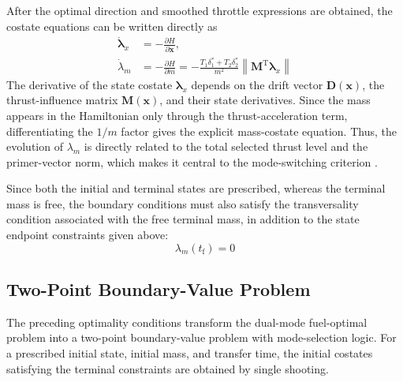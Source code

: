 ﻿\documentclass{IEEEtaes}
\begin{document}
After the optimal direction and smoothed throttle expressions are obtained, the costate equations can be written directly as
\begin{equation}
\begin{aligned}
\dot{\bm{\lambda}}_x&=-\frac{\partial H}{\partial \bm{x}},\\
\dot{\lambda}_m&=-\frac{\partial H}{\partial m}
=-\frac{T_1\delta_1^{*}+T_2\delta_2^{*}}{m^2}\left\|\bm{M}^{\mathrm{T}}\bm{\lambda}_x\right\|
\end{aligned}
\end{equation}
The derivative of the state costate $\bm{\lambda}_x$ depends on the drift vector $\bm{D}(\bm{x})$, the thrust-influence matrix $\bm{M}(\bm{x})$, and their state derivatives. Since the mass appears in the Hamiltonian only through the thrust-acceleration term, differentiating the $1/m$ factor gives the explicit mass-costate equation. Thus, the evolution of $\lambda_m$ is directly related to the total selected thrust level and the primer-vector norm, which makes it central to the mode-switching criterion \cite{chi2022,russell2007,cline2024a}.

Since both the initial and terminal states are prescribed, whereas the terminal mass is free, the boundary conditions must also satisfy the transversality condition associated with the free terminal mass, in addition to the state endpoint constraints given above:
\begin{equation}
\lambda_m(t_{\mathrm{f}})=0
\end{equation}

\subsection{Two-Point Boundary-Value Problem}
The preceding optimality conditions transform the dual-mode fuel-optimal problem into a two-point boundary-value problem with mode-selection logic. For a prescribed initial state, initial mass, and transfer time, the initial costates satisfying the terminal constraints are obtained by single shooting.
\end{document}
